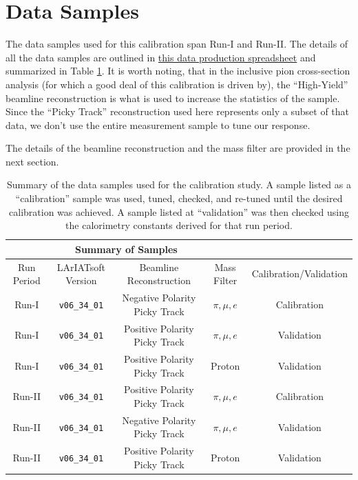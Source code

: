 \section{Data Samples}\label{sec:DataSamples}
The data samples used for this calibration span Run-I and Run-II. The details of all the data samples are outlined in \href{https://docs.google.com/spreadsheets/d/1_0kNCKBIIx53f6vopqN2OijtcTICHD9rDvN_YKGH2mI/edit?usp=sharing}{this data production spreadsheet} and summarized in Table \ref{tab:samples}. It is worth noting, that in the inclusive pion cross-section analysis (for which a good deal of this calibration is driven by), the ``High-Yield'' beamline reconstruction is what is used to increase the statistics of the sample. Since the ``Picky Track'' reconstruction used here represents only a subset of that data, we don't use the entire measurement sample to tune our response. 

The details of the beamline reconstruction and the mass filter are provided in the next section.

\begin{center}
\begin{table}[htb]
	\begin{center}
	\begin{tabular}{c|c|c|c|c}
	\multicolumn{4}{c}{\textbf{Summary of Samples}} \\
	\hline \hline
	 Run Period & LArIATsoft Version & Beamline Reconstruction & Mass Filter & Calibration/Validation\\
	\hline
	Run-I & \verb!v06_34_01! & Negative Polarity Picky Track & $\pi, \mu, e$ & Calibration \\
	\hline
	Run-I & \verb!v06_34_01! & Positive Polarity Picky Track & $\pi, \mu, e$ & Validation \\
	\hline
	Run-I & \verb!v06_34_01! & Positive Polarity Picky Track & Proton & Validation \\
	\hline
	Run-II & \verb!v06_34_01! & Positive Polarity Picky Track & $\pi, \mu, e$ & Calibration \\
	\hline
	Run-II & \verb!v06_34_01! & Negative Polarity Picky Track & $\pi, \mu, e$ & Validation \\
	\hline
	Run-II & \verb!v06_34_01! & Positive Polarity Picky Track & Proton & Validation \\
	\hline
	\end{tabular}%
	\caption{Summary of the data samples used for the calibration study. A sample listed as a ``calibration'' sample was used, tuned, checked, and re-tuned until the desired calibration was achieved. A sample listed at ``validation'' was then checked using the calorimetry constants derived for that run period. }
	\label{tab:samples}
	\end{center}
\end{table}
\end{center}

